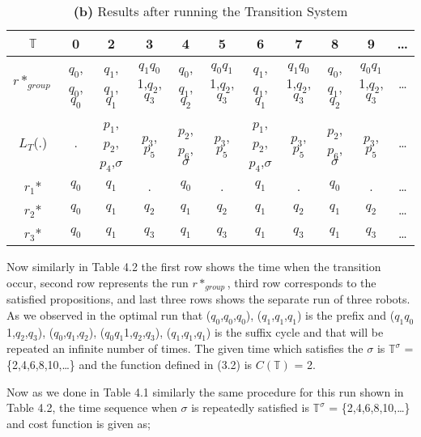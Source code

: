 \vspace{10pt}
\begin{table}[h]
\centering
\caption{\textbf{(b)} Results after running the Transition System} %
\addtolength{\tabcolsep}{-6pt}
\small
\begin{tabular}{|c|c|c|c|c|c|c|c|c|c|c|} %
\hline %
$\mathbb{T}$ & 0 & 2 & 3 & 4 & 5 & 6 & 7 & 8 & 9 & \dots \\  [2ex] %
\hline %
$r*_{group}$ & $q_0$,$q_0$,$q_0$ & $q_1$,$q_1$,$q_1$ & $q_1$$q_0$1,$q_2$,$q_3$ & $q_0$,$q_1$,$q_2$ & $q_0$$q_1$1,$q_2$,$q_3$ & $q_1$,$q_1$,$q_1$ & $q_1$$q_0$1,$q_2$,$q_3$ & $q_0$,$q_1$,$q_2$ & $q_0$$q_1$1,$q_2$,$q_3$ & \dots \\ [2ex] %
$L_T$(.) & . & $p_1$,$p_2$,$p_4$,$\sigma$ & $p_3$,$p_5$ & $p_2$,$p_6$,$\sigma$ & $p_3$,$p_5$ & $p_1$,$p_2$,$p_4$,$\sigma$ & $p_3$,$p_5$ & $p_2$,$p_6$,$\sigma$ & $p_3$,$p_5$ & \dots \\ [2ex]
$r_1$* & $q_0$ & $q_1$ & . & $q_0$ & . & $q_1$ & . & $q_0$ & . & \dots \\ [2ex]
$r_2$* & $q_0$ & $q_1$ & $q_2$ & $q_1$ & $q_2$ & $q_1$ & $q_2$ & $q_1$ & $q_2$ & \dots \\ [2ex]
$r_3$* & $q_0$ & $q_1$ & $q_3$ & $q_1$ & $q_3$ & $q_1$ & $q_3$ & $q_1$ & $q_3$ & \dots \\ [2ex] %
\hline %
\end{tabular}
\label{table:nonlin} %
\end{table}

\vspace{10pt}
Now similarly in Table 4.2 the first row shows the time when the transition occur, second row represents the run $r*_{group}$, third row corresponds to the satisfied propositions, and last three rows shows the separate run of three robots. As we observed in the optimal run that ($q_0$,$q_0$,$q_0$), ($q_1$,$q_1$,$q_1$) is the prefix and ($q_1$$q_0$1,$q_2$,$q_3$), ($q_0$,$q_1$,$q_2$), ($q_0$$q_1$1,$q_2$,$q_3$), ($q_1$,$q_1$,$q_1$) is the suffix cycle and that will be repeated an infinite number of times. The given time which satisfies the $\sigma$ is $\mathbb{T^\sigma}$ = \{2,4,6,8,10,\dots\} and the function defined in (3.2) is $C(\mathbb{T})$ = 2.

Now as we done in Table 4.1 similarly the same procedure for this run shown in Table 4.2, the time sequence when $\sigma$ is repeatedly satisfied is $\mathbb{T^\sigma}$ = \{2,4,6,8,10,\dots\} and cost function is given as;


